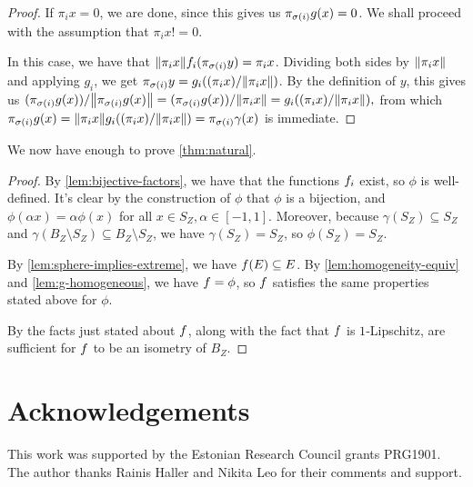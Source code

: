 \documentclass{amsart}
\theoremstyle{definition}
\begin{document}
\begin{proof}
	If $\pi_i x = 0$, we are done, since this gives us
	$\pi_{\sigma(i)} g(x) = 0$. We shall proceed with the assumption that
  $\pi_i x != 0$.

	In this case, we have that
  $\norm{\pi_i x}f_i (\pi_{\sigma(i)} y) = \pi_i x$.
	Dividing both sides by $\norm{\pi_i x}$ and applying $g_i$, we get
	$\pi_{\sigma(i)} y = g_i ((\pi_i x)/\norm{\pi_i x})$.
	By the definition of $y$, this gives us
  $ (\pi_{\sigma(i)} g(x))/\norm{\pi_{\sigma(i)} g(x)} = (\pi_{\sigma(i)} g(x))/\norm{\pi_i x} = g_i ((\pi_i x)/\norm{\pi_i x}), $
	from which
	$\pi_{\sigma(i)} g(x) = \norm{\pi_i x}g_i ((\pi_i x)/\norm{\pi_i x}) = \pi_{\sigma(i)} \gamma(x)$
	is immediate.
\end{proof}


We now have enough to prove \autoref{thm:natural}.

\begin{proof} 

  By \autoref{lem:bijective-factors}, we have that the functions $f_i$ exist,
  so $\phi$ is well-defined.
  It's clear by the construction of $\phi$ that $\phi$ is a bijection, and $\phi(\alpha x) = \alpha \phi(x)$
  for all $x \in S_Z, \alpha \in [-1,1]$. Moreover, because $\gamma(S_Z) \subseteq S_Z$ and $\gamma(B_Z\setminus S_Z) \subseteq B_Z \setminus S_Z$, we have $\gamma(S_Z) = S_Z$, so $\phi(S_Z) = S_Z$.

  

  By \autoref{lem:sphere-implies-extreme}, we have $f(E) \subseteq E$.
  By \autoref{lem:homogeneity-equiv} and \autoref{lem:g-homogeneous}, we have $f = \phi$,
  so $f$ satisfies the same properties stated above for $\phi$.

By \autocite[Lemma 2.5]{cascales:2016}
  the facts just stated about $f$, along with the fact that $f$ is $1$‑Lipschitz, are sufficient for $f$ to be an isometry of $B_Z$.
\end{proof}


\section*{Acknowledgements}

This work was supported by the Estonian Research Council grants PRG1901. The author thanks Rainis Haller and Nikita Leo for their comments and support.


\printbibliography
\end{document}
